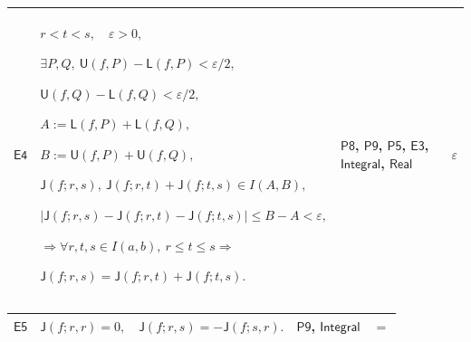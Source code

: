 \documentclass[11pt]{amsart}
\newlength{\FTCFourColumnBody}
\begin{document}
{\begin{tabular}
\end{tabular}%
\par\setlength{\parskip}{0pt}\nointerlineskip
\noindent
\begin{tabular}{|@{}>{\centering\arraybackslash}m{0.078431\FTCFourColumnBody}|>{\centering\arraybackslash}m{0.535947\FTCFourColumnBody}|>{\centering\arraybackslash}m{0.281045\FTCFourColumnBody}|>{\centering\arraybackslash}m{0.104575\FTCFourColumnBody}|}\hline
\hypertarget{proof:E4}{$\displaystyle \textsf{E4}$} & $\displaystyle r<t<s,\quad\varepsilon>0,$\par
$\displaystyle \exists P,Q,\ \textsf{U}(f,P)-\textsf{L}(f,P)<\varepsilon/2,$\par
$\displaystyle \textsf{U}(f,Q)-\textsf{L}(f,Q)<\varepsilon/2,$\par
$\displaystyle A:=\textsf{L}(f,P)+\textsf{L}(f,Q),$\par
$\displaystyle B:=\textsf{U}(f,P)+\textsf{U}(f,Q),$\par
$\displaystyle \textsf{J}(f;r,s),\ \textsf{J}(f;r,t)+\textsf{J}(f;t,s)\in I(A,B),$\par
$\displaystyle |\textsf{J}(f;r,s)-\textsf{J}(f;r,t)-\textsf{J}(f;t,s)|\le B-A<\varepsilon,$\par
$\displaystyle \Rightarrow\forall r,t,s\in I(a,b),\ r\le t\le s\Rightarrow$\par
$\displaystyle \textsf{J}(f;r,s)=\textsf{J}(f;r,t)+\textsf{J}(f;t,s).$ & \hyperlink{proof:P8}{$\displaystyle \textsf{P8}$}, \hyperlink{proof:P9}{$\displaystyle \textsf{P9}$}, \hyperlink{proof:P5}{$\displaystyle \textsf{P5}$}, \hyperlink{proof:E3}{$\displaystyle \textsf{E3}$}, \hyperlink{def:Integral}{$\displaystyle \textsf{Integral}$}, \hyperlink{ax:Real}{$\displaystyle \textsf{Real}$} & $\displaystyle \varepsilon$\\ \hline
\end{tabular}%
\par\setlength{\parskip}{0pt}\nointerlineskip
\noindent
\begin{tabular}{|@{}>{\centering\arraybackslash}m{0.078431\FTCFourColumnBody}|>{\centering\arraybackslash}m{0.535947\FTCFourColumnBody}|>{\centering\arraybackslash}m{0.281045\FTCFourColumnBody}|>{\centering\arraybackslash}m{0.104575\FTCFourColumnBody}|}\hline
\hypertarget{proof:E5}{$\displaystyle \textsf{E5}$} & $\displaystyle \textsf{J}(f;r,r)=0,\quad\textsf{J}(f;r,s)=-\textsf{J}(f;s,r).$ & \hyperlink{proof:P9}{$\displaystyle \textsf{P9}$}, \hyperlink{def:Integral}{$\displaystyle \textsf{Integral}$} & $\displaystyle =$\\ \hline

\end{tabular}}
\end{document}
